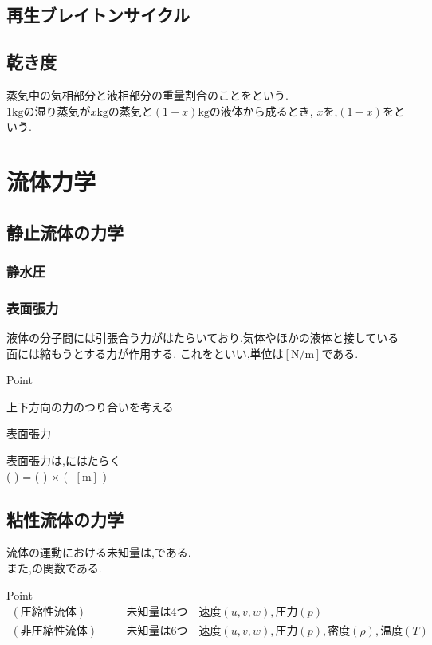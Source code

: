 \documentclass[a4paper]{jsarticle}
\begin{document}
\subsection{再生ブレイトンサイクル}
\subsection{乾き度}
蒸気中の気相部分と液相部分の重量割合のことをという.\\
$1\mathrm{kg}$の湿り蒸気が$x\mathrm{kg}$の蒸気と$\left(1-x\right)\mathrm{kg}$の液体から成るとき,
$x$を,$\left(1-x\right)$をという.
\newpage
\section{流体力学}
\subsection{静止流体の力学}
\subsubsection{静水圧}

\subsubsection{表面張力}
液体の分子間には引張合う力がはたらいており,気体やほかの液体と接している面には縮もうとする力が作用する.
これをといい,単位は$\left[\mathrm{N/m}\right]$である.
\begin{itembox}[l]{Point}
    \begin{center}
        上下方向の力のつり合いを考える\\
    \end{center}
\end{itembox}
\begin{itembox}[l]{表面張力}
    \begin{center}
        表面張力は,にはたらく\\
        (  ) = ( ) $\times$ ( $\;\left[\mathrm{m}\right]$ )
    \end{center}
\end{itembox}
\subsection{粘性流体の力学}
流体の運動における未知量は,である.\\
また,の関数である.\\
\begin{itembox}[l]{Point}
    \begin{eqnarray*}
        (圧縮性流体)&&\quad 未知量は4つ\quad 速度\left(u,v,w\right),圧力\left(p\right)\\
        (非圧縮性流体)&&\quad 未知量は6つ\quad 速度\left(u,v,w\right),圧力\left(p\right),密度\left(\rho\right),温度\left(T\right)\\
    \end{eqnarray*}
\end{itembox}
\end{document}
